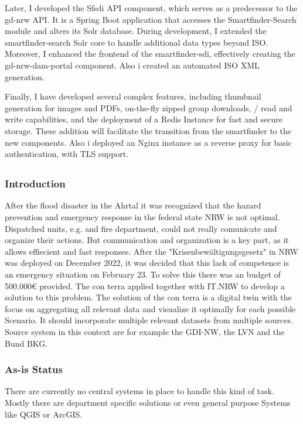 \documentclass[11pt, titlepage, a4paper]{article}
\begin{document}
Later, I developed the Sfsdi API component, which serves as a predecessor to the gd-nrw API. It is a Spring Boot application that accesses the Smartfinder-Search module and alters its Solr database. During development, I extended the smartfinder-search Solr core to handle additional data types beyond ISO. Moreover, I enhanced the frontend of the smartfinder-sdi, effectively creating the gd-nrw-dam-portal component.
Also i created an automated ISO XML generation.

Finally, I have developed several complex features, including thumbnail generation for images and PDFs, on-the-fly zipped group downloads, / read and write capabilities, and the deployment of a Redis Instance for fast and secure storage. These addition will facilitate the transition from the smartfinder to the new components. Also i deployed an Nginx instance as a reverse proxy for basic authentication, with TLS support. 



\subsection{}
\subsubsection{Introduction}
After the flood disaster in the Ahrtal it was recognized that the hazard prevention and emergency response in the federal state NRW is not optimal. Dispatched units, e.g.  and fire department, could not really comunicate and organize their actions. But communication and organization is a key part, as it allows effiecient and fast responses. 
After the "Krisenbewältigungsgesetz" in NRW was deployed on December 2022, it was decided that this lack of competence is an emergency situation on February 23. To solve this there was an budget of 500.000€ provided.
The con terra applied together with IT.NRW to develop a solution to this problem.
The solution of the con terra is a digital twin with the focus on aggregating all relevant data and visualize it optimally for each possible Scenario.  It should incorporate multiple relevant datasets from multiple sources. Source system in this context are for example the GDI-NW, the LVN and the Bund BKG.


\subsubsection{As-is Status}
There are currently no central systems in place to handle this kind of task. Mostly there are department specific solutions or even general purpose Systems like QGIS or ArcGIS.
\end{document}
